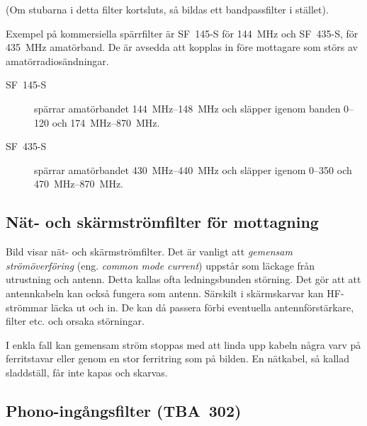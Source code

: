 (Om stubarna i detta filter kortsluts, så bildas ett bandpassfilter i stället).

Exempel på kommersiella spärrfilter är SF~145-S för \qty{144}{\mega\hertz} och
SF~435-S, för \qty{435}{\mega\hertz} amatörband.
De är avsedda att kopplas in före mottagare som störs av amatörradiosändningar.

\begin{description}
\item[SF~145-S] spärrar amatörbandet \SIrange{144}{148}{\mega\hertz} och släpper
igenom banden 0--120 och \SIrange{174}{870}{\mega\hertz}.

\item[SF~435-S] spärrar amatörbandet \SIrange{430}{440}{\mega\hertz} och släpper
igenom 0--350 och \SIrange{470}{870}{\mega\hertz}.
\end{description}

\subsection{Nät- och skärmströmfilter för mottagning}


Bild  visar nät- och skärmströmfilter.
Det är vanligt att \emph{gemensam strömöverföring} (eng.
\emph{common mode current}) uppstår som läckage från utrustning och antenn.
Detta kallas ofta ledningsbunden störning.
Det gör att att antennkabeln kan också fungera som antenn.
Särskilt i skärmskarvar kan HF-strömmar läcka ut och in.
De kan då passera förbi eventuella antennförstärkare, filter etc. och orsaka
störningar.

I enkla fall kan gemensam ström stoppas med att linda upp kabeln några varv på
ferritstavar eller genom en stor ferritring som på bilden.
En nätkabel, så kallad sladdställ, får inte kapas och skarvas.

\newpage
\subsection{Phono-ingångsfilter (TBA~302)}



